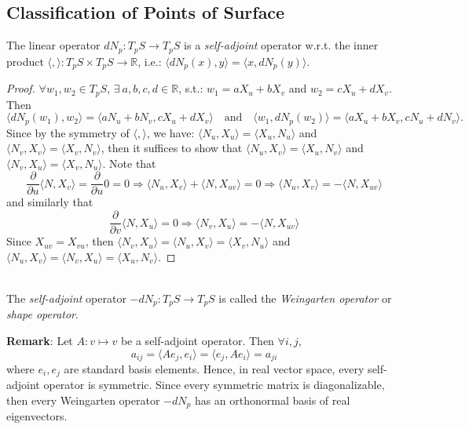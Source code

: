 \subsection{Classification of Points of Surface}

\begin{proposition}
The linear operator $dN_p: T_pS\to T_pS$ is a \textit{self-adjoint} operator w.r.t. the inner product $\langle,\rangle: T_pS\times T_pS\to\mathbb{R}$, i.e.: $\langle dN_p(x), y\rangle = \langle x, dN_p(y)\rangle$.
\end{proposition}

\begin{proof}
$\forall w_1, w_2\in T_pS$, $\exists\ a, b, c, d\in\mathbb{R}$, s.t.: $w_1 = aX_u + bX_v$ and $w_2 = cX_u + dX_v$. Then
\[
\big\langle dN_p(w_1), w_2\big\rangle = \langle aN_u + bN_v, cX_u + dX_v\rangle \quad\text{and}\quad \big\langle w_1, dN_p(w_2)\big\rangle = \langle aX_u + bX_v, cN_u + dN_v\rangle.
\]
Since by the symmetry of $\langle,\rangle$, we have: $\langle N_u, X_u\rangle = \langle X_u, N_u\rangle$ and $\langle N_v, X_v\rangle = \langle X_v, N_v\rangle$, then it suffices to show that $\langle N_u, X_v\rangle = \langle X_u, N_v\rangle$ and $\langle N_v, X_u\rangle = \langle X_v, N_u\rangle$. Note that
\[
\frac{\partial}{\partial u}\langle N, X_v\rangle = \frac{\partial}{\partial u}0 = 0 \Rightarrow \langle N_u, X_v\rangle + \langle N, X_{uv}\rangle = 0 \Rightarrow \langle N_u, X_v\rangle = -\langle N, X_{uv}\rangle
\]
and similarly that
\[
\frac{\partial}{\partial v}\langle N, X_u\rangle = 0 \Rightarrow \langle N_v, X_u\rangle = -\langle N, X_{uv}\rangle
\]
Since $X_{uv} = X_{vu}$, then $\langle N_v, X_u\rangle = \langle N_u, X_v\rangle = \langle X_v, N_u\rangle$ and $\langle N_u, X_v\rangle = \langle N_v, X_u\rangle = \langle X_u, N_v\rangle$.
\end{proof}

\\
The \textit{self-adjoint} operator $-dN_p: T_pS\to T_pS$ is called the \textit{Weingarten operator} or \textit{shape operator}.

\noindent\textbf{Remark}: Let $A: v\mapsto v$ be a self-adjoint operator. Then $\forall i, j$,
\[
a_{ij} = \langle Ae_j, e_i\rangle = \langle e_j, Ae_i\rangle = a_{ji}
\]
where $e_i, e_j$ are standard basis elements. Hence, in real vector space, every self-adjoint operator is symmetric. Since every symmetric matrix is diagonalizable, then every Weingarten operator $-dN_p$ has an orthonormal basis of real eigenvectors.

